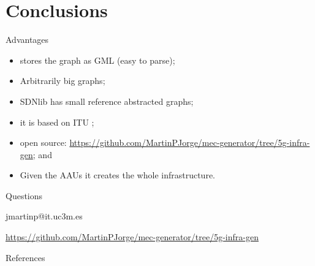 \documentclass{beamer}
\begin{document}
\section{Conclusions}
\begin{frame}{Advantages}
    \begin{itemize}
        \item stores the graph as GML (easy to parse);
        \item Arbitrarily big graphs;
        \item SDNlib has small reference abstracted graphs;
        \item it is based on ITU \cite{itu};
        \item open source: \url{https://github.com/MartinPJorge/mec-generator/tree/5g-infra-gen}; and
        \item Given the AAUs it creates the whole infrastructure.
    \end{itemize}
\end{frame}

\begin{frame}{Questions}
    \begin{center}
        jmartinp@it.uc3m.es

        \vfill
        \url{https://github.com/MartinPJorge/mec-generator/tree/5g-infra-gen}
    \end{center}
\end{frame}


\begin{frame}{References}
    
    
\end{frame}
\end{document}
